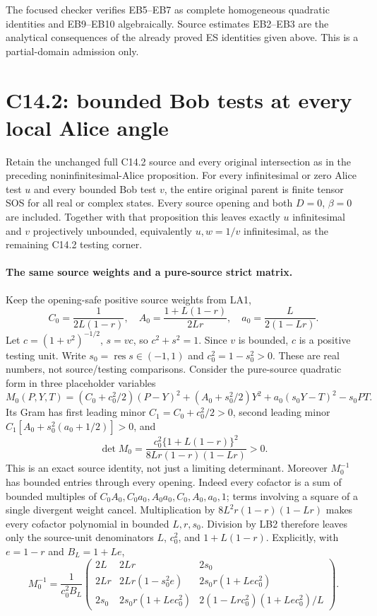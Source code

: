 The focused checker verifies EB5--EB7 as complete homogeneous
quadratic identities and EB9--EB10 algebraically. Source estimates
EB2--EB3 are the analytical consequences of the already proved
ES identities given above. This is a partial-domain admission only.


\section{\texorpdfstring{C14.2: bounded Bob tests at every local Alice angle}{C14.2: bounded Bob tests at every local Alice angle}}
\label{component:pda4a21937f64}

\label{pda4a21937f64:sec:r18-c142-bounded-bob}

\begin{proposition}
Retain the unchanged full C14.2 source and every original intersection
as in the preceding noninfinitesimal-Alice proposition.  For every
infinitesimal or zero Alice test $u$ and every bounded Bob test $v$,
the entire original parent is finite tensor SOS for all real or
complex states.  Every source opening and both $D=0$, $\beta=0$
are included.  Together with that proposition this leaves exactly
$u$ infinitesimal and $v$ projectively unbounded, equivalently
$u,w=1/v$ infinitesimal, as the remaining C14.2 testing corner.
\end{proposition}

\paragraph{The same source weights and a pure-source strict matrix.}
Keep the opening-safe positive source weights from LA1,
\[
 C_0=\frac1{2L(1-r)},\quad
 A_0=\frac{1+L(1-r)}{2Lr},\quad
 a_0=\frac L{2(1-Lr)}.
\]
Let $c=(1+v^2)^{-1/2}$, $s=vc$, so $c^2+s^2=1$.
Since $v$ is bounded, $c$ is a positive testing unit.  Write
$s_0=\operatorname{res}s\in(-1,1)$ and $c_0^2=1-s_0^2>0$.
These are real numbers, not source/testing comparisons.  Consider
the pure-source quadratic form in three placeholder variables
\[
 M_0(P,Y,T)=
  (C_0+c_0^2/2)(P-Y)^2+(A_0+s_0^2/2)Y^2
          +a_0(s_0Y-T)^2-s_0PT.                    \tag{LB1}
\]
Its Gram has first leading minor $C_1=C_0+c_0^2/2>0$,
second leading minor $C_1[A_0+s_0^2(a_0+1/2)]>0$, and
\[
 \det M_0=
 \frac{c_0^2\{1+L(1-r)\}^2}
                {8Lr(1-r)(1-Lr)}>0.               \tag{LB2}
\]
This is an exact source identity, not just a limiting determinant.
Moreover $M_0^{-1}$ has bounded entries through every opening.
Indeed every cofactor is a sum of bounded multiples of
$C_0A_0,C_0a_0,A_0a_0,C_0,A_0,a_0,1$; terms involving a square
of a single divergent weight cancel.  Multiplication by
$8L^2r(1-r)(1-Lr)$ makes every cofactor polynomial in bounded
$L,r,s_0$.  Division by LB2 therefore leaves only the source-unit
denominators $L$, $c_0^2$, and $1+L(1-r)$.
Explicitly, with $e=1-r$ and $B_L=1+Le$,
\[
 M_0^{-1}=\frac1{c_0^2B_L}
 \begin{pmatrix}
 2L&2Lr&2s_0\\
 2Lr&2Lr(1-s_0^2e)&2s_0r(1+Le c_0^2)\\
 2s_0&2s_0r(1+Le c_0^2)&
       2(1-Lr c_0^2)(1+Le c_0^2)/L
 \end{pmatrix}.                                      \tag{LB2a}
\]

